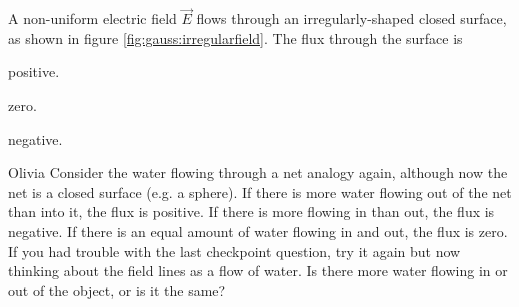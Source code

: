 \begin{checkpoint}\label{cp:gauss:unitsofflux}
\begin{MCquestion}{A non-uniform electric field $\vec E$ flows through an irregularly-shaped closed surface, as shown in figure \ref{fig:gauss:irregularfield}. The flux through the surface is}
 \item positive.
 \item zero. \correct
\item negative.
\end{MCquestion}
\end{checkpoint}
\begin{studentOpinion}{Olivia}
Consider the water flowing through a net analogy again, although now the net is a closed surface (e.g. a sphere). If there is more water flowing out of the net than into it, the flux is positive. If there is more flowing in than out, the flux is negative. If there is an equal amount of water flowing in and out, the flux is zero. If you had trouble with the last checkpoint question, try it again but now thinking about the field lines as a flow of water. Is there more water flowing in or out of the object, or is it the same?
\end{studentOpinion}

